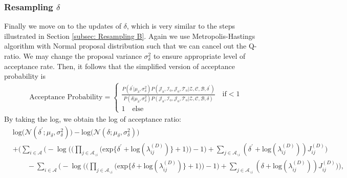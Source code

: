 \documentclass[a4paper]{article}
\begin{document}
   \subsubsection{Resampling $\delta$ }  \label{subsec: Resampling delta}
   Finally we move on to the updates of $\delta$, which is very similar to the steps illustrated in Section \ref{subsec: Resampling B}. Again we use Metropolis-Hastings algorithm with Normal proposal distribution such that we can cancel out the Q-ratio. We may change the proposal variance $\sigma^2_\delta$ to ensure appropriate level of acceptance rate. Then, it follows that the simplified version of acceptance probability is 
   \begin{equation} 
   \begin{split}
   & \mbox{Acceptance Probability}=
   \begin{cases}  \frac{P(\delta^\prime|\mu_\delta, \sigma^2_\delta) P(\mathcal{J}_{\mbox{a}}, \mathcal{I}_{\mbox{o}}, \mathcal{J}_{\mbox{o}}, \mathcal{T}_{\mbox{o}} |\mathcal{Z}, \mathcal{C}, \mathcal{B}, \delta^\prime)}{P(\delta|\mu_\delta, \sigma^2_\delta) P(\mathcal{J}_{\mbox{a}}, \mathcal{I}_{\mbox{o}}, \mathcal{J}_{\mbox{o}}, \mathcal{T}_{\mbox{o}} |\mathcal{Z}, \mathcal{C}, \mathcal{B}, \delta)}\quad\text{if}  <1\\
   1 \quad \text{else}
   \end{cases}
   \end{split}
   \end{equation}
   By taking the log, we obtain the log of acceptance ratio:
   \begin{equation}
   \begin{aligned} 
   &\mbox{log}\Big(\mathcal{N}(\delta^\prime;\mu_\delta, \sigma^2_\delta)\Big)-\mbox{log}\Big(\mathcal{N}(\delta; \mu_\delta, \sigma^2_\delta)\Big)\\&+ \Bigg(\sum_{i\in \mathcal{A}}\Big(-\log\Big(\Big(\prod_{j \in \mathcal{A}_{\backslash i}} \Big(\mbox{exp}\{\delta^\prime+\mbox{log}(\lambda_{ij}^{(D)})\} + 1\Big)\Big)-1\Big) + \sum_{j \in \mathcal{A}_{\backslash i}} (\delta^\prime+\mbox{log}(\lambda_{ij}^{(D)}))J_{ij}^{(D)}\Big)
   \\&\quad\quad -\sum_{i\in \mathcal{A}}\Big(-\log\Big(\Big(\prod_{j \in \mathcal{A}_{\backslash i}} \Big(\mbox{exp}\{\delta+\mbox{log}(\lambda_{ij}^{(D)})\} + 1\Big)\Big)-1\Big) + \sum_{j \in \mathcal{A}_{\backslash i}} (\delta+\mbox{log}(\lambda_{ij}^{(D)}))J_{ij}^{(D)}\Big)\Bigg),
   \end{aligned}
   \end{equation}
\end{document}
